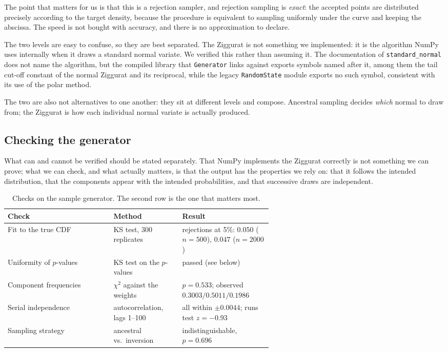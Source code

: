 \documentclass[11pt]{article}
\begin{document}
The point that matters for us is that this is a rejection sampler, and rejection sampling is
\emph{exact}: the accepted points are distributed precisely according to the target density,
because the procedure is equivalent to sampling uniformly under the curve and keeping the
abscissa. The speed is not bought with accuracy, and there is no approximation to declare.

The two levels are easy to confuse, so they are best separated. The Ziggurat is not something
we implemented: it is the algorithm NumPy uses internally when it draws a standard normal
variate. We verified this rather than assuming it. The documentation of
\texttt{standard\_normal} does not name the algorithm, but the compiled library that
\texttt{Generator} links against exports symbols named after it, among them the tail cut-off constant of the normal Ziggurat and its
reciprocal, while the legacy \texttt{RandomState} module exports no such symbol, consistent
with its use of the polar method.

The two are also not alternatives to one another: they sit at different levels and compose.
Ancestral sampling decides \emph{which} normal to draw from; the Ziggurat is how each
individual normal variate is actually produced.

\subsection{Checking the generator}

What can and cannot be verified should be stated separately. That NumPy implements the
Ziggurat correctly is not something we can prove; what we can check, and what actually
matters, is that the output has the properties we rely on: that it follows the intended
distribution, that the components appear with the intended probabilities, and that
successive draws are independent.

\begin{table}[H]
\centering
\begin{tabular}{@{}l>{\raggedright\arraybackslash}p{0.26\linewidth}>{\raggedright\arraybackslash}p{0.34\linewidth}@{}}
\toprule
\textbf{Check} & \textbf{Method} & \textbf{Result} \\
\midrule
Fit to the true CDF & KS test, 300 replicates & rejections at 5\%: $0.050$ ($n{=}500$),
  $0.047$ ($n{=}2000$) \\
Uniformity of $p$-values & KS test on the $p$-values & passed (see below) \\
Component frequencies & $\chi^2$ against the weights & $p = 0.533$; observed
  $0.3003 / 0.5011 / 0.1986$ \\
Serial independence & autocorrelation, lags 1--100 & all within $\pm 0.0044$;
  runs test $z = -0.93$ \\
Sampling strategy & ancestral vs.\ inversion & indistinguishable, $p = 0.696$ \\
\bottomrule
\end{tabular}
\caption{Checks on the sample generator. The second row is the one that matters most.}
\label{tab:generator}
\end{table}
\end{document}
